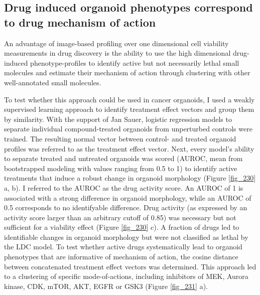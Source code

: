 \begin{flushleft}
\subsection{Drug induced organoid phenotypes correspond to drug mechanism of action}

An advantage of image-based profiling over one dimensional cell viability measurements in drug discovery is the ability to use the high dimensional drug-induced phenotype-profiles to identify active but not necessarily lethal small molecules and estimate their mechanism of action through clustering with other well-annotated small molecules. 

\bigbreak
To test whether this approach could be used in cancer organoids, I used a weakly supervised learning approach to identify treatment effect vectors and group them by similarity. With the support of Jan Sauer, logistic regression models to separate individual compound-treated organoids from unperturbed controls were trained. The resulting normal vector between control- and treated organoid profiles was referred to as the treatment effect vector. Next, every model’s ability to separate treated and untreated organoids was scored (AUROC, mean from bootstrapped modeling with values ranging from 0.5 to 1) to identify active treatments that induce a robust change in organoid morphology (Figure \ref{fig_230} a, b). I referred to the AUROC as the drug activity score. An AUROC of 1 is associated with a strong difference in organoid morphology, while an AUROC of 0.5 corresponds to no identifyable difference. Drug activity (as expressed by an activity score larger than an arbitrary cutoff of 0.85) was necessary but not sufficient for a viability effect (Figure \ref{fig_230} c). A fraction of drugs led to identifiable changes in organoid morphology but were not classified as lethal by the LDC model. To test whether active drugs systematically lead to organoid phenotypes that are informative of mechanism of action, the cosine distance between concatenated treatment effect vectors was determined. This approach led to a clustering of specific mode-of-actions, including inhibitors of MEK, Aurora kinase, CDK, mTOR, AKT, EGFR or GSK3 (Figure \ref{fig_231} a). 


\end{flushleft}
